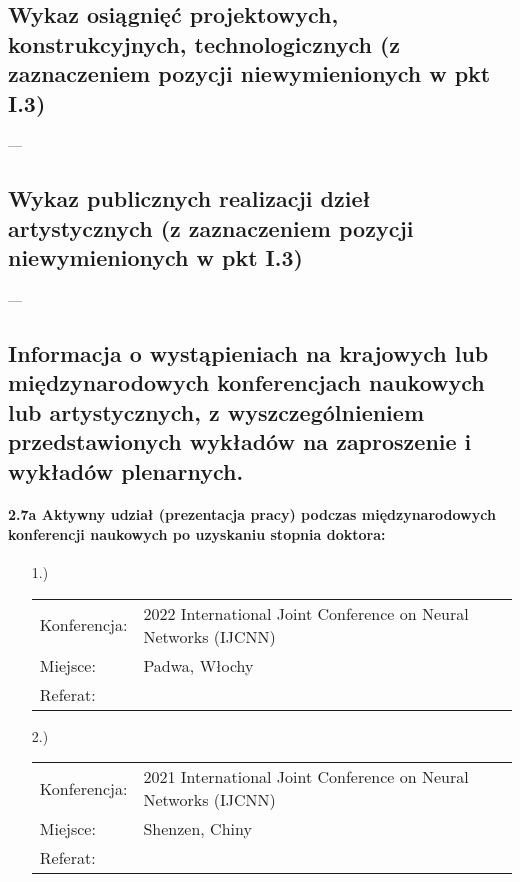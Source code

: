 \begin{fullwidth}
\subsection{Wykaz osiągnięć projektowych, konstrukcyjnych, technologicznych (z zaznaczeniem pozycji niewymienionych w pkt I.3)}

---

\subsection{Wykaz publicznych realizacji dzieł artystycznych (z zaznaczeniem pozycji niewymienionych w pkt I.3)}

---

\subsection{Informacja o wystąpieniach na krajowych lub międzynarodowych konferencjach naukowych lub artystycznych, z wyszczególnieniem przedstawionych wykładów na zaproszenie i wykładów plenarnych.}

\paragraph{2.7a Aktywny udział (prezentacja pracy) podczas międzynarodowych konferencji naukowych po uzyskaniu stopnia doktora:}
\begin{itemize}
	\item[1.)]~\\
	
	\begin{tabular}{p{7em}p{32.5em}}
	Konferencja:& 2022 International Joint Conference on Neural Networks (IJCNN)\\
	Miejsce:& Padwa, Włochy\\
	Referat: & \textbf{\fullcite{Kom22}}			
	\end{tabular}
	\item[2.)]~\\
	
	\begin{tabular}{p{7em}p{32.5em}}
	Konferencja:& 2021 International Joint Conference on Neural Networks (IJCNN)\\
	Miejsce: & Shenzen, Chiny\\
	Referat: & \textbf{\fullcite{C3}}					
	\end{tabular}


\end{itemize}
\end{fullwidth}

